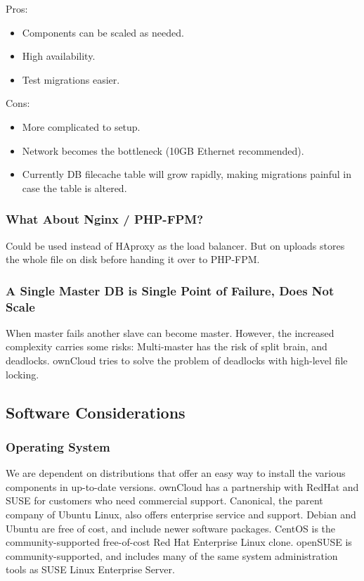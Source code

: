 \documentclass[letterpaper,10pt,english]{sphinxmanual}
\begin{document}
Pros:
\begin{itemize}
\item {} 
Components can be scaled as needed.

\item {} 
High availability.

\item {} 
Test migrations easier.

\end{itemize}

Cons:
\begin{itemize}
\item {} 
More complicated to setup.

\item {} 
Network becomes the bottleneck (10GB Ethernet recommended).

\item {} 
Currently DB filecache table will grow rapidly, making migrations painful in
case the table is altered.

\end{itemize}


\subsubsection{What About Nginx / PHP-FPM?}
\label{installation/deployment_recommendations:what-about-nginx-php-fpm}
Could be used instead of HAproxy as the load balancer.
But on uploads stores the whole file on disk before handing it over to PHP-FPM.


\subsubsection{A Single Master DB is Single Point of Failure, Does Not Scale}
\label{installation/deployment_recommendations:a-single-master-db-is-single-point-of-failure-does-not-scale}
When master fails another slave can become master. However, the increased
complexity carries some risks: Multi-master has the risk of split brain, and
deadlocks. ownCloud tries to solve the problem of deadlocks with high-level
file locking.


\subsection{Software Considerations}
\label{installation/deployment_recommendations:software-considerations}

\subsubsection{Operating System}
\label{installation/deployment_recommendations:operating-system}
We are dependent on distributions that offer an easy way to install the various
components in up-to-date versions. ownCloud has a partnership with RedHat
and SUSE for customers who need commercial support. Canonical, the parent
company of Ubuntu Linux, also offers enterprise service and support. Debian
and Ubuntu are free of cost, and include newer software packages. CentOS is the
community-supported free-of-cost Red Hat Enterprise Linux clone. openSUSE is
community-supported, and includes many of the same system administration tools
as SUSE Linux Enterprise Server.
\end{document}
